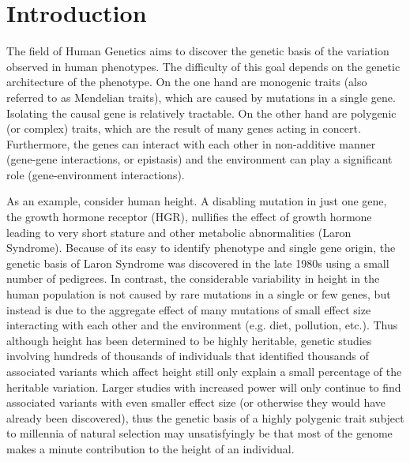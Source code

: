 \chapter{Introduction}

The field of Human Genetics aims to discover the genetic basis of the
variation observed in human phenotypes. The difficulty of this goal
depends on the genetic architecture of the phenotype. On the one hand
are monogenic traits (also referred to as Mendelian traits), which are
caused by mutations in a single gene. Isolating the causal gene is
relatively tractable. On the other hand are polygenic (or complex)
traits, which are the result of many genes acting in
concert. Furthermore, the genes can interact with each other in
non-additive manner (gene-gene interactions, or epistasis) and the
environment can play a significant role (gene-environment
interactions).

As an example, consider human height. A disabling mutation in just one
gene, the growth hormone receptor (HGR), nullifies the effect of
growth hormone leading to very short stature and other metabolic
abnormalities (Laron Syndrome). Because of its easy to identify
phenotype and single gene origin, the genetic basis of Laron Syndrome
was discovered in the late 1980s using a small number of pedigrees. In
contrast, the considerable variability in height in the human
population is not caused by rare mutations in a single or few genes,
but instead is due to the aggregate effect of many mutations of small
effect size interacting with each other and the environment
(e.g. diet, pollution, etc.). Thus although height has been determined
to be highly heritable, genetic studies involving hundreds of
thousands of individuals that identified thousands of associated
variants which affect height still only explain a small percentage of
the heritable variation. Larger studies with increased power will only
continue to find associated variants with even smaller effect size (or
otherwise they would have already been discovered), thus the genetic
basis of a highly polygenic trait subject to millennia of natural
selection may unsatisfyingly be that most of the genome makes a minute
contribution to the height of an individual.

